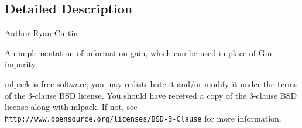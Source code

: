 \subsection{Detailed Description}
\begin{DoxyAuthor}{Author}
Ryan Curtin
\end{DoxyAuthor}
An implementation of information gain, which can be used in place of Gini impurity.

mlpack is free software; you may redistribute it and/or modify it under the terms of the 3-\/clause B\+SD license. You should have received a copy of the 3-\/clause B\+SD license along with mlpack. If not, see {\tt http\+://www.\+opensource.\+org/licenses/\+B\+S\+D-\/3-\/\+Clause} for more information. 